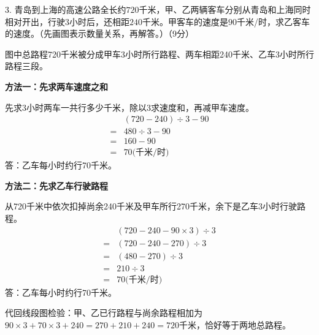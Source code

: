 3. 青岛到上海的高速公路全长约\(720\)千米，甲、乙两辆客车分别从青岛和上海同时相对开出，行驶\(3\)小时后，还相距\(240\)千米。甲客车的速度是\(90\)千米/时，求乙客车的速度。（先画图表示数量关系，再解答。）（9分）\par
\begin{BookAnswer}
图中总路程720千米被分成甲车3小时所行路程、两车相距240千米、乙车3小时所行路程三段。\par \textbf{方法一：先求两车速度之和}\par 先求3小时两车一共行多少千米，除以3求速度和，再减甲车速度。\[\begin{aligned} &(720-240)\div3-90\\ ={}&480\div3-90\\ ={}&160-90\\ ={}&70\text{(千米/时)}\end{aligned}\]答：乙车每小时约行70千米。\par \textbf{方法二：先求乙车行驶路程}\par 从720千米中依次扣掉尚余240千米及甲车所行270千米，余下是乙车3小时行驶路程。\[\begin{aligned} &(720-240-90\times3)\div3\\ ={}&(720-240-270)\div3\\ ={}&(480-270)\div3\\ ={}&210\div3\\ ={}&70\text{(千米/时)}\end{aligned}\]答：乙车每小时约行70千米。\par \par 代回线段图检验：甲、乙已行路程与尚余路程相加为\(90\times3+70\times3+240=270+210+240=720\)千米，恰好等于两地总路程。
\end{BookAnswer}

